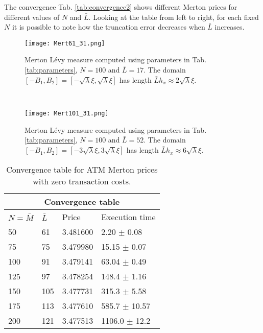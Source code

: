 The convergence Tab. \ref{tab:convergence2} shows different Merton prices for different values of $N$ and $\bar L$.
Looking at the table from left to right, for each fixed $N$ it is possible to note how the truncation error decreases when $\bar L$ increases.
\begin{figure}[t!]
 \begin{minipage}[b]{0.5\linewidth}
   \centering
   \texttt{[image: Mert61\_31.png]}
   \caption{Merton L\'evy measure computed using parameters in Tab. \ref{tab:parameters}, $N=100$ and $\bar L=17$. 
   The domain $[-B_1,B_2] = [-\sqrt{\lambda} \xi,\sqrt{\lambda} \xi]$ has length $\bar L h_x \approx 2 \sqrt{\lambda} \xi$.}
   \label{Fig13} 
 \end{minipage}
 \ \hspace{2mm} \hspace{3mm} \
 \begin{minipage}[b]{0.5\linewidth}
  \centering
   \texttt{[image: Mert101\_31.png]}
   \caption{Merton L\'evy measure computed using parameters in Tab. \ref{tab:parameters}, $N=100$ and $\bar L=52$. 
   The domain $[-B_1,B_2] = [-3\sqrt{\lambda}\xi,3\sqrt{\lambda}\xi]$ has length $\bar L h_x \approx 6 \sqrt{\lambda} \xi$.}
   \label{Fig14}
 \end{minipage}
\end{figure}
\begin{table}[ht]
\centering
 \begin{tabular}{llll}
 \toprule
  \multicolumn{4}{c}{\textbf{Convergence table}} \\
  \midrule
  $N = \bar M$ & $\bar L$ & Price & Execution time \\
  \midrule
    50  & 61  & 3.481600 & 2.20 $\pm$ 0.08 \\
    75  & 75  & 3.479980 & 15.15 $\pm$ 0.07 \\
    100 & 91  & 3.479141 & 63.04 $\pm$ 0.49 \\
    125 & 97  & 3.478254 & 148.4 $\pm$ 1.16 \\
    150 & 105 & 3.477731 & 315.3 $\pm$ 5.58 \\
    175 & 113 & 3.477610 & 585.7 $\pm$ 10.57 \\ 
    200 & 121 & 3.477513 & 1106.0 $\pm$ 12.2 \\
  \bottomrule
  \end{tabular}
  \caption{Convergence table for ATM Merton prices with zero transaction costs.}
  \label{tab:convergence3}
\end{table}



